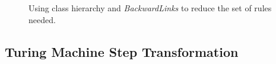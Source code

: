 \begin{figure}[h]
\begin{center}
  \caption{Using class hierarchy and \emph{BackwardLinks} to reduce the set of rules needed.}
  \label{fig:ExecuteAutomataTransformationOutlineRuleSymbol}
\end{center}
\end{figure}




\clearpage
\subsection{Turing Machine Step Transformation}
\label{subsec:turing_machine_trans}

